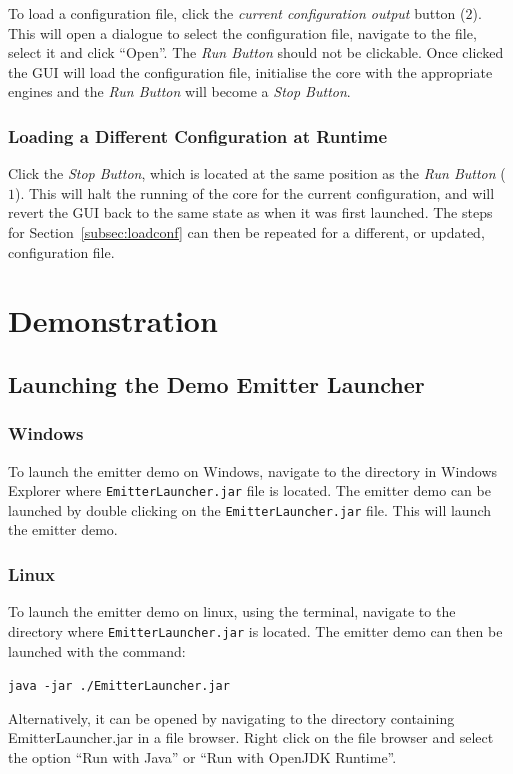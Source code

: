 \documentclass[10pt,a4paper]{article}
\begin{document}
To load a configuration file, click the \emph{current configuration output} button ($2$). This will open a dialogue to select the configuration file, navigate to the file, select it and click ``Open''. The \emph{Run Button} should not be clickable. Once clicked the GUI will load the configuration file, initialise the core with the appropriate engines and the \emph{Run Button} will become a \emph{Stop Button}.

\subsubsection{Loading a Different Configuration at Runtime}

Click the \emph{Stop Button}, which is located at the same position as the \emph{Run Button} ($1$). This will halt the running of the core for the current configuration, and will revert the GUI back to the same state as when it was first launched. The steps for Section~\ref{subsec:loadconf} can then be repeated for a different, or updated, configuration file.

\section{Demonstration}
\label{subsec:demo}
\subsection{Launching the Demo Emitter Launcher}
\subsubsection{Windows}
To launch the emitter demo on Windows, navigate to the directory in Windows Explorer where \texttt{EmitterLauncher.jar} file is located. The emitter demo can be launched by double clicking on the \texttt{EmitterLauncher.jar} file. This will launch the emitter demo.
\subsubsection{Linux}
To launch the emitter demo on linux, using the terminal, navigate to the directory where \texttt{EmitterLauncher.jar} is located. The emitter demo can then be launched with the command:
\begin{center}
\texttt{java -jar ./EmitterLauncher.jar}
\end{center}
Alternatively, it can be opened by navigating to the directory containing EmitterLauncher.jar in a file browser. Right click on the file browser and select the option ``Run with Java'' or ``Run with OpenJDK Runtime''.
\end{document}
